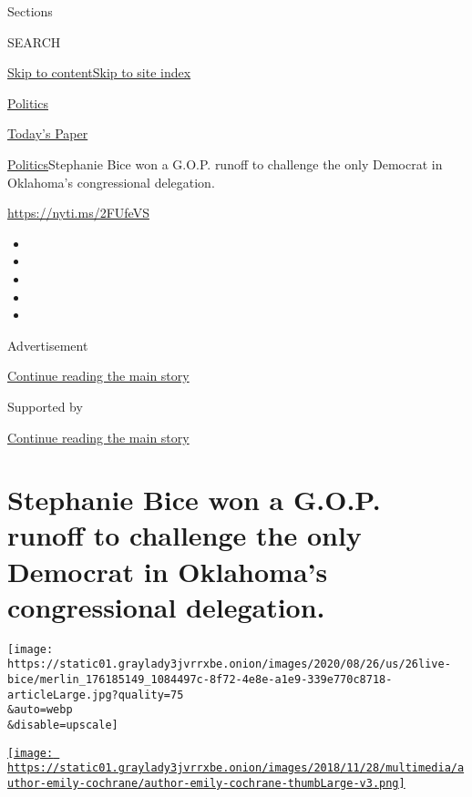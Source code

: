 Sections

SEARCH

\protect\hyperlink{site-content}{Skip to
content}\protect\hyperlink{site-index}{Skip to site index}

\href{https://www.nytimes3xbfgragh.onion/section/politics}{Politics}

\href{https://myaccount.nytimes3xbfgragh.onion/auth/login?response_type=cookie\&client_id=vi}{}

\href{https://www.nytimes3xbfgragh.onion/section/todayspaper}{Today's
Paper}

\href{/section/politics}{Politics}\textbar{}Stephanie Bice won a G.O.P.
runoff to challenge the only Democrat in Oklahoma's congressional
delegation.

\url{https://nyti.ms/2FUfeVS}

\begin{itemize}
\item
\item
\item
\item
\item
\end{itemize}

Advertisement

\protect\hyperlink{after-top}{Continue reading the main story}

Supported by

\protect\hyperlink{after-sponsor}{Continue reading the main story}

\hypertarget{stephanie-bice-won-a-gop-runoff-to-challenge-the-only-democrat-in-oklahomas-congressional-delegation}{%
\section{Stephanie Bice won a G.O.P. runoff to challenge the only
Democrat in Oklahoma's congressional
delegation.}\label{stephanie-bice-won-a-gop-runoff-to-challenge-the-only-democrat-in-oklahomas-congressional-delegation}}

\texttt{[image: https://static01.graylady3jvrrxbe.onion/images/2020/08/26/us/26live-bice/merlin\_176185149\_1084497c-8f72-4e8e-a1e9-339e770c8718-articleLarge.jpg?quality=75\\\&auto=webp\\\&disable=upscale]}

\href{https://www.nytimes3xbfgragh.onion/by/emily-cochrane}{\texttt{[image: https://static01.graylady3jvrrxbe.onion/images/2018/11/28/multimedia/author-emily-cochrane/author-emily-cochrane-thumbLarge-v3.png]}}

